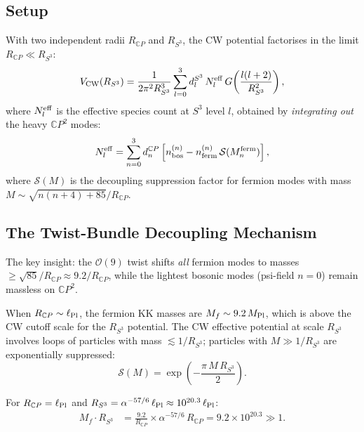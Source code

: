 \documentclass[11pt,a4paper]{article}
\newcounter{findingctr}
\newenvironment{finding}[1][]{%
  \refstepcounter{findingctr}%
  \begin{tcolorbox}[colback=blue!3!white, colframe=blue!50!black,
    title=\textbf{Finding \thefindingctr: #1}]
}{%
  \end{tcolorbox}%
}
\newcommand{\CP}{\mathbb{C}P}
\newcommand{\Mpl}{M_{\rm Pl}}
\newcommand{\lPl}{\ell_{\rm Pl}}
\newcommand{\alphafine}{\alpha}
\begin{document}
\begin{finding}[\textbf{CRITICAL}: Two-Modulus Landscape with
  $R_{\CP} \sim \lPl \ll R_{S^3}$ Can Close Step 9]
\label{find:alpha57-resolution}

\subsection*{Setup}

With two independent radii $R_{\CP}$ and $R_{S^3}$, the CW potential
factorises in the limit $R_{\CP} \ll R_{S^3}$:
\begin{equation}
V_{\rm CW}(R_{S^3}) = \frac{1}{2\pi^2 R_{S^3}^3}
\sum_{l=0}^3 d_l^{S^3}\,N_l^{\rm eff}\,
G\!\left(\frac{l(l+2)}{R_{S^3}^2}\right),
\end{equation}
where $N_l^{\rm eff}$ is the effective species count at $S^3$ level
$l$, obtained by \emph{integrating out} the heavy $\CP^2$ modes:
\begin{equation}
N_l^{\rm eff} = \sum_{n=0}^3 d_n^{\CP}\left[
n_{\rm bos}^{(n)} - n_{\rm ferm}^{(n)}\,\mathcal{S}(M_n^{\rm ferm})
\right],
\end{equation}
where $\mathcal{S}(M)$ is the decoupling suppression factor for
fermion modes with mass $M \sim \sqrt{n(n+4) + 85}/R_{\CP}$.

\subsection*{The Twist-Bundle Decoupling Mechanism}

The key insight: the $\mathcal{O}(9)$ twist shifts \emph{all} fermion
modes to masses $\geq \sqrt{85}/R_{\CP} \approx 9.2/R_{\CP}$, while
the lightest bosonic modes (psi-field $n=0$) remain massless on $\CP^2$.

When $R_{\CP} \sim \lPl$, the fermion KK masses are
$M_f \sim 9.2\,\Mpl$, which is above the CW cutoff scale for the
$R_{S^3}$ potential.  The CW effective potential at scale $R_{S^3}$
involves loops of particles with mass $\lesssim 1/R_{S^3}$; particles
with $M \gg 1/R_{S^3}$ are exponentially suppressed:
\begin{equation}
\mathcal{S}(M) = \exp\!\left(-\frac{\pi\,M\,R_{S^3}}{2}\right).
\end{equation}

For $R_{\CP} = \lPl$ and $R_{S^3} = \alphafine^{-57/6}\,\lPl
\approx 10^{20.3}\,\lPl$:
\begin{align}
M_f \cdot R_{S^3} &= \frac{9.2}{R_{\CP}} \times
  \alphafine^{-57/6}\,R_{\CP} = 9.2 \times 10^{20.3} \gg 1.
\end{align}


\end{finding}
\end{document}
